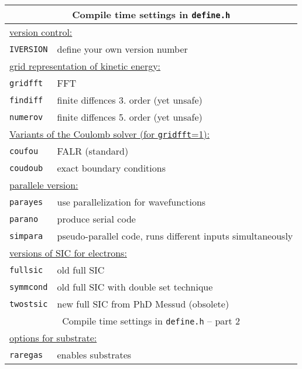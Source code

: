 \documentclass[12pt]{article}
\begin{document}
\begin{tabular}{ll}
\hline
\multicolumn{2}{c}{Compile time settings in {\tt define.h}} \\
\hline
\multicolumn{2}{l}{\underline{version control:}}\\
{\tt IVERSION} & define your own version number\\
\hline
\multicolumn{2}{l}{\underline{grid representation of kinetic energy:}}\\
{\tt gridfft} & FFT \\
{\tt findiff} & finite diffences 3. order (yet unsafe)\\
{\tt numerov} & finite diffences 5. order (yet unsafe)\\
\hline
\multicolumn{2}{l}{\underline{Variants of the Coulomb solver (for {\tt gridfft}=1):}}\\
{\tt coufou} & FALR (standard)\\
{\tt coudoub} & exact boundary conditions\\
\hline
\multicolumn{2}{l}{\underline{parallele version:}}\\
{\tt parayes} & use parallelization for wavefunctions \\
{\tt parano}  & produce serial code\\
{\tt simpara} & pseudo-parallel code, runs different inputs
simultaneously\\
\hline
\multicolumn{2}{l}{\underline{versions of SIC for electrons:}}\\
{\tt fullsic} & old full SIC  \\
{\tt symmcond} & old full SIC with double set technique \\
{\tt twostsic} & new full SIC from PhD Messud (obsolete)\\
\hline
\multicolumn{2}{c}{Compile time settings in {\tt define.h} -- part 2} \\
\hline
\multicolumn{2}{l}{\underline{options for substrate:}}\\
{\tt raregas} & enables substrates\\
\hline
\end{tabular}

\newpage
\end{document}

